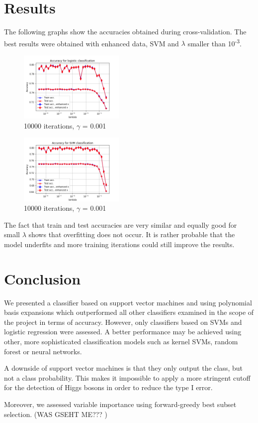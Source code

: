 \documentclass[10pt,conference,compsocconf]{IEEEtran}
\begin{document}
\section*{Results}
The following graphs show the accuracies obtained during cross-validation. The best results were obtained with enhanced data, SVM and $\lambda$ smaller than 10\textsuperscript{-3}.
\begin{figure}[H]
	\centering
	\includegraphics[width=0.45\textwidth]{accuracy_logistic.png}
	\caption{10000 iterations, $\gamma$ = 0.001}
\end{figure}

\begin{figure}[H]
	\centering
	\includegraphics[width=0.45\textwidth]{accuracy_SVM.png}
	\caption{10000 iterations, $\gamma$ = 0.001}
\end{figure}

The fact that train and test accuracies are very similar and equally good for small $\lambda$ shows that overfitting does not occur. It is rather probable that the model underfits and more training iterations could still improve the results.

\section*{Conclusion}
We presented a classifier based on support vector machines and using polynomial basis expansions which outperformed all other classifiers examined in the scope of the project in terms of accuracy. However, only classifiers based on SVMs and logistic regression were assessed. A better performance may be achieved using other, more sophisticated classification models such as kernel SVMs, random forest or neural networks. 
\par
A downside of support vector machines is that they only output the class, but not a class probability. This makes it impossible to apply a more stringent cutoff for the detection of Higgs bosons in order to reduce the type I error. 
\par
Moreover, we assessed variable importance using forward-greedy best subset selection. (WAS GSEHT ME??? ) 


\end{document}
